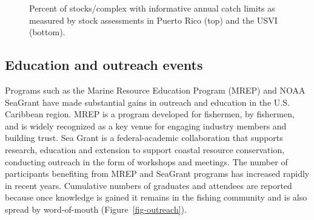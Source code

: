 \documentclass[
  letterpaper,
  oneside,
  open=any]{scrbook}
\begin{document}
\begin{figure}


\caption{\label{fig-tier3}Percent of stocks/complex with informative
annual catch limits as measured by stock assessments in Puerto Rico
(top) and the USVI (bottom).}

\end{figure}%

\subsection{Education and outreach
events}\label{education-and-outreach-events}

Programs such as the Marine Resource Education Program (MREP) and NOAA
SeaGrant have made substantial gains in outreach and education in the
U.S. Caribbean region. MREP is a program developed for fishermen, by
fishermen, and is widely recognized as a key venue for engaging industry
members and building trust. Sea Grant is a federal-academic
collaboration that supports research, education and extension to support
coastal resource conservation, conducting outreach in the form of
workshops and meetings. The number of participants benefiting from MREP
and SeaGrant programs has increased rapidly in recent years. Cumulative
numbers of graduates and attendees are reported because once knowledge
is gained it remains in the fishing community and is also spread by
word-of-mouth (Figure~\ref{fig-outreach}).
\end{document}
